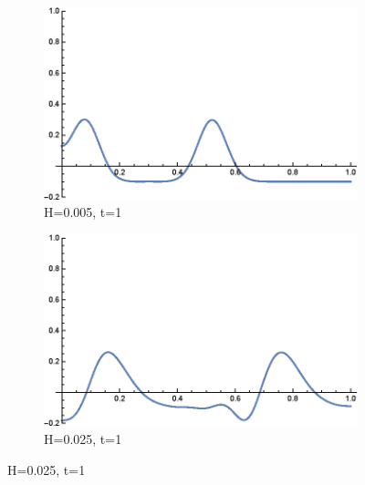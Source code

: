 \documentclass[12pt]{article}
\numberwithin{equation}{section}
\begin{document}
\begin{figure}
    \begin{subfigure}[b]{0.42\textwidth}
        \includegraphics[width=\textwidth]{figures/linear-solution/linear-solution-H_0.005_t_1.0.eps}
        \caption{H=0.005, t=1}
    \end{subfigure}
    \hfill
    \begin{subfigure}[b]{0.42\textwidth}
        \includegraphics[width=\textwidth]{figures/linear-solution/linear-solution-H_0.025_t_1.0.eps}
        \caption{H=0.025, t=1}
    \end{subfigure}
    

\end{figure}
\end{document}
